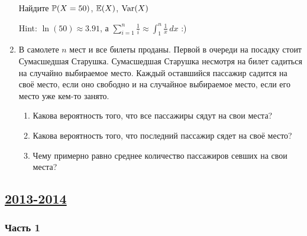 \begin{enumerate}
Найдите $\P(X=50)$, $\E(X)$, $\Var(X)$

Hint: $\ln(50)\approx 3.91$, а $\sum_{i=1}^n \frac{1}{i} \approx \int_1^n \frac{1}{x}\, dx$ :)

\item В самолете $n$ мест и все билеты проданы. Первой в очереди на посадку стоит
Сумасшедшая Старушка. Сумасшедшая Старушка несмотря на билет садиться на случайно
выбираемое место. Каждый оставшийся пассажир садится на своё место, если оно свободно
и на случайное выбираемое место, если его место уже кем-то занято.
\begin{enumerate}
\item Какова вероятность того, что все пассажиры сядут на свои места?
\item Какова вероятность того, что последний пассажир сядет на своё место?
\item Чему примерно равно среднее количество пассажиров севших на свои места?
\end{enumerate}
\end{enumerate}



\newpage
\subsection[2013-2014]{\hyperref[sec:sol_kr_01_ip_2013_2014]{2013-2014}}
\label{sec:kr_01_ip_2013_2014}

\subsubsection*{Часть 1}

